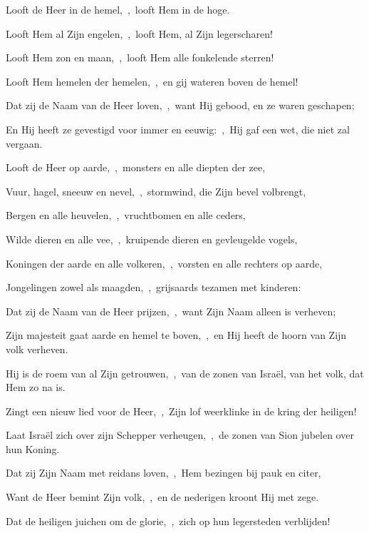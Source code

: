 \documentclass[12pt,twoside,a5paper]{article}
\begin{document}
\begin{halfparskip}
   

   Looft de Heer in de hemel,~\sep\ looft Hem in de hoge.

  Looft Hem al Zijn engelen,~\sep\ looft Hem, al Zijn legerscharen!

  Looft Hem zon en maan,~\sep\ looft Hem alle fonkelende sterren!

  Looft Hem hemelen der hemelen,~\sep\ en gij wateren boven de hemel!

  Dat zij de Naam van de Heer loven,~\sep\ want Hij gebood, en ze waren geschapen;

  En Hij heeft ze gevestigd voor immer en eeuwig:~\sep\ Hij gaf een wet, die niet zal vergaan.

  Looft de Heer op aarde,~\sep\ monsters en alle diepten der zee,

  Vuur, hagel, sneeuw en nevel,~\sep\ stormwind, die Zijn bevel volbrengt,

  Bergen en alle heuvelen,~\sep\ vruchtbomen en alle ceders,

  Wilde dieren en alle vee,~\sep\ kruipende dieren en gevleugelde vogels,

  Koningen der aarde en alle volkeren,~\sep\ vorsten en alle rechters op aarde,

  Jongelingen zowel als maagden,~\sep\ grijsaards tezamen met kinderen:

  Dat zij de Naam van de Heer prijzen,~\sep\ want Zijn Naam alleen is verheven;

  Zijn majesteit gaat aarde en hemel te boven,~\sep\ en Hij heeft de hoorn van Zijn volk verheven.

  Hij is de roem van al Zijn getrouwen,~\sep\ van de zonen van Israël, van het volk, dat Hem zo na is.

    Zingt een nieuw lied voor de Heer,~\sep\ Zijn lof weerklinke in de kring der heiligen!

  Laat Israël zich over zijn Schepper verheugen,~\sep\ de zonen van Sion jubelen over hun Koning.

  Dat zij Zijn Naam met reidans loven,~\sep\ Hem bezingen bij pauk en citer,

  Want de Heer bemint Zijn volk,~\sep\ en de nederigen kroont Hij met zege.

  Dat de heiligen juichen om de glorie,~\sep\ zich op hun legersteden verblijden!


\end{halfparskip}
\end{document}
